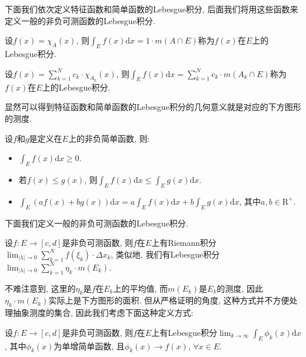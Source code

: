 \documentclass[theorem=false,mathfont=none,openany,sub3section]{easybook}
\begin{document}
下面我们依次定义特征函数和简单函数的Lebesgue积分, 后面我们将用这些函数来定义一般的非负可测函数的Lebesgue积分.\par

\begin{definition}
  设$f(x)=\chi_{A}(x)$, 则$\int_{E}f(x)\mathrm{d}x=1\cdot m(A\cap E)$称为$f(x)$在$E$上的Lebesgue积分.\par
  设$f(x)=\sum_{k=1}^{N}c_k\cdot \chi_{A_k}(x)$, 则$\int_{E}f(x)\mathrm{d}x=\sum_{k=1}^{N}c_k\cdot m(A_k\cap E)$称为$f(x)$在$E$上的Lebesgue积分.\par
\end{definition}

\begin{remark}
  显然可以得到特征函数和简单函数的Lebesgue积分的几何意义就是对应的下方图形的测度.\par
\end{remark}

\begin{lemma}
  设$f$和$g$是定义在$E$上的非负简单函数, 则:\par
  \begin{itemize}
    \item $\int_{E}f(x)\mathrm{d}x\geqslant 0$.
    \item 若$f(x)\leqslant g(x)$, 则$\int_{E}f(x)\mathrm{d}x\leqslant \int_{E}g(x)\mathrm{d}x$.
    \item $\int_{E}(af(x)+bg(x))\mathrm{d}x=a\int_{E}f(x)\mathrm{d}x+b\int_{E}g(x)\mathrm{d}x$, 其中$a,b\in \mathrm{R}^{+}$.
  \end{itemize}
\end{lemma}

下面我们定义一般的非负可测函数的Lebesgue积分.\par

\begin{definition}
  设$f:E\rightarrow [c,d]$是非负可测函数, 则$f$在$E$上有Riemann积分$\lim_{|\lambda|\rightarrow 0}\sum_{k=1}^{N}f(\xi_k)\cdot \Delta x_k$, 类似地, 我们有Lebesgue积分$\lim_{|\lambda|\rightarrow 0}\sum_{k=1}^{N}\eta_k\cdot m(E_k)$.\par
\end{definition}

不难注意到, 这里的$\eta_k$是$f$在$E_k$上的平均值, 而$m(E_k)$是$E_k$的测度, 因此$\eta_k\cdot m(E_k)$实际上是下方图形的面积. 但从严格证明的角度, 这种方式并不方便处理抽象测度的集合, 因此我们考虑下面这种定义方式:\par

\begin{definition}
  设$f:E\rightarrow [c,d]$是非负可测函数, 则$f$在$E$上有Lebesgue积分$\lim_{k\to \infty}\int_{E}\phi_k(x)\mathrm{d}x$, 其中$\phi_k(x)$为单增简单函数, 且$\phi_k(x)\rightarrow  f(x)$, $\forall x\in E$.\par
\end{definition}
\end{document}
